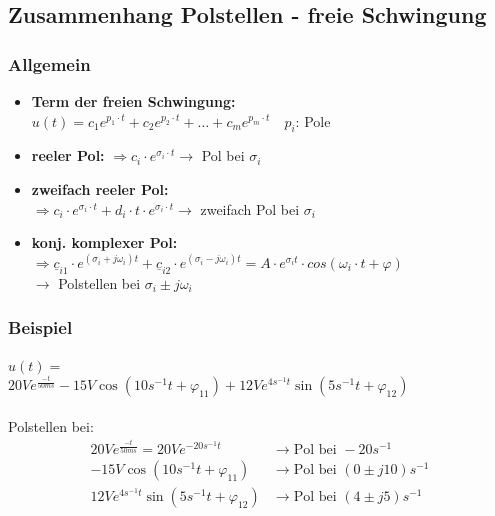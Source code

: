 \subsection{Zusammenhang Polstellen - freie Schwingung}
\begin{multicols}{2}
\subsubsection{Allgemein}
\begin{itemize}
	\item \textbf{Term der freien Schwingung:}\\
		  $u(t)=c_1 e^{p_1 \cdot t}+c_2 e^{p_2\cdot t}+\ldots+c_m e^{p_m \cdot t}\quad
		  p_i$: Pole		
	 	\item \textbf{reeler Pol:} $\Rightarrow c_i\cdot 	e^{\sigma_i\cdot t} \rightarrow$ Pol bei $\sigma_i$
		\item \textbf{zweifach reeler Pol:}\\ $\Rightarrow c_i\cdot e^{\sigma_i\cdot t} + d_i \cdot t \cdot e^{\sigma_i\cdot t} \rightarrow$ zweifach Pol bei $\sigma_i$
		\item \textbf{konj. komplexer Pol:}\\
		$\Rightarrow \underline{c}_{i1}\cdot e^{(\sigma_i+j\omega_i)t} + \underline{c}_{i2}\cdot e^{(\sigma_i-j\omega_i)t} = A \cdot e^{\sigma_i t} \cdot cos(\omega_i\cdot t + \varphi)$ \\$\rightarrow$ Polstellen bei $\sigma_i \pm j\omega_i$
		
\end{itemize}

\subsubsection{Beispiel}
$u(t)=$\\$20Ve^{\frac{-t}{50ms}}-15V\cos(10s^{-1}t+\varphi_{11})+12Ve^{4s^{-1}t}\sin(5s^{-1}t+\varphi_{12})$\\ \\
Polstellen bei:
\begin{align}
	20Ve^{\frac{-t}{50ms}} = 20Ve^{-20s^{-1}t} &\rightarrow \text{Pol bei }
	-20s^{-1}\nonumber\\
	-15V\cos(10s^{-1}t+\varphi_{11}) &\rightarrow \text{Pol bei }
	(0\pm j10)s^{-1}\nonumber\\
	12Ve^{4s^{-1}t}\sin(5s^{-1}t+\varphi_{12}) &\rightarrow \text{Pol bei } (4\pm
	j5)s^{-1}\nonumber
\end{align}

\end{multicols}


